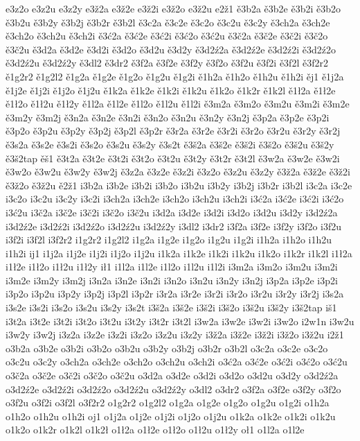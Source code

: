 {e3z2o
e3z2u
e3z2y
e3ž2a
e3ž2e
e3ž2i
e3ž2o
e3ž2u
e2ž1                       
ě3b2a 
ě3b2e 
ě3b2i 
ě3b2o
ě3b2u
ě3b2y
ě3b2j
ě3b2r
ě3b2l
ě3c2a
ě3c2e
ě3c2o
ě3c2u
ě3c2y
ě3ch2a
ě3ch2e
ě3ch2o
ě3ch2u
ě3ch2i
ě3ć2a
ě3ć2e
ě3ć2i
ě3ć2o
ě3ć2u
ě3č2a
ě3č2e
ě3č2i
ě3č2o
ě3č2u
ě3d2a
ě3d2e
ě3d2i
ě3d2o
ě3d2u
ě3d2y
ě3d2ź2a
ě3d2ź2e
ě3d2ź2i
ě3d2ź2o
ě3d2ź2u
ě3d2ź2y
ě3dl2
ě3dr2
ě3f2a
ě3f2e
ě3f2y
ě3f2o
ě3f2u
ě3f2i
ě3f2l
ě3f2r2
ě1g2r2
ě1g2l2
ě1g2a
ě1g2e
ě1g2o
ě1g2u
ě1g2i
ě1h2a
ě1h2o
ě1h2u
ě1h2i
ěj1
ě1j2a
ě1j2e
ě1j2i
ě1j2o
ě1j2u
ě1k2a
ě1k2e
ě1k2i
ě1k2u
ě1k2o
ě1k2r
ě1k2l
ě1ł2a
ě1ł2e
ě1ł2o
ě1ł2u
ě1ł2y
ě1l2a
ě1l2e
ě1l2o
ě1l2u
ě1l2i
ě3m2a
ě3m2o
ě3m2u
ě3m2i
ě3m2e
ě3m2y
ě3m2j
ě3n2a
ě3n2e
ě3n2i
ě3n2o
ě3n2u
ě3n2y
ě3n2j
ě3p2a
ě3p2e
ě3p2i
ě3p2o
ě3p2u
ě3p2y
ě3p2j
ě3p2l
ě3p2r
ě3r2a
ě3r2e
ě3r2i
ě3r2o
ě3r2u
ě3r2y
ě3r2j
ě3s2a
ě3s2e
ě3s2i
ě3s2o
ě3s2u
ě3s2y
ě3s2t
ě3š2a
ě3š2e
ě3š2i
ě3š2o
ě3š2u
ě3š2y
ě3š2tap
ěš1
ě3t2a
ě3t2e
ě3t2i
ě3t2o
ě3t2u
ě3t2y
ě3t2r
ě3t2l
ě3w2a
ě3w2e
ě3w2i
ě3w2o
ě3w2u
ě3w2y
ě3w2j
ě3z2a
ě3z2e
ě3z2i
ě3z2o
ě3z2u
ě3z2y
ě3ž2a
ě3ž2e
ě3ž2i
ě3ž2o
ě3ž2u
ě2ž1                       
i3b2a 
i3b2e 
i3b2i 
i3b2o
i3b2u
i3b2y
i3b2j
i3b2r
i3b2l
i3c2a
i3c2e
i3c2o
i3c2u
i3c2y
i3c2i
i3ch2a
i3ch2e
i3ch2o
i3ch2u
i3ch2i
i3ć2a
i3ć2e
i3ć2i
i3ć2o
i3ć2u
i3č2a
i3č2e
i3č2i
i3č2o
i3č2u
i3d2a
i3d2e
i3d2i
i3d2o
i3d2u
i3d2y
i3d2ź2a
i3d2ź2e
i3d2ź2i
i3d2ź2o
i3d2ź2u
i3d2ź2y
i3dl2
i3dr2
i3f2a
i3f2e
i3f2y
i3f2o
i3f2u
i3f2i
i3f2l
i3f2r2
i1g2r2
i1g2l2
i1g2a
i1g2e
i1g2o
i1g2u
i1g2i
i1h2a
i1h2o
i1h2u
i1h2i
ij1
i1j2a
i1j2e
i1j2i
i1j2o
i1j2u
i1k2a
i1k2e
i1k2i
i1k2u
i1k2o
i1k2r
i1k2l
i1ł2a
i1ł2e
i1ł2o
i1ł2u
i1ł2y
ił1
i1l2a
i1l2e
i1l2o
i1l2u
i1l2i
i3m2a
i3m2o
i3m2u
i3m2i
i3m2e
i3m2y
i3m2j
i3n2a
i3n2e
i3n2i
i3n2o
i3n2u
i3n2y
i3n2j
i3p2a
i3p2e
i3p2i
i3p2o
i3p2u
i3p2y
i3p2j
i3p2l
i3p2r
i3r2a
i3r2e
i3r2i
i3r2o
i3r2u
i3r2y
i3r2j
i3s2a
i3s2e
i3s2i
i3s2o
i3s2u
i3s2y
i3s2t
i3š2a
i3š2e
i3š2i
i3š2o
i3š2u
i3š2y
i3š2tap
iš1
i3t2a
i3t2e
i3t2i
i3t2o
i3t2u
i3t2y
i3t2r
i3t2l
i3w2a
i3w2e
i3w2i
i3w2o
i2w1n
i3w2u
i3w2y
i3w2j
i3z2a
i3z2e
i3z2i
i3z2o
i3z2u
i3z2y
i3ž2a
i3ž2e
i3ž2i
i3ž2o
i3ž2u
i2ž1                       
o3b2a 
o3b2e 
o3b2i 
o3b2o
o3b2u
o3b2y
o3b2j
o3b2r
o3b2l
o3c2a
o3c2e
o3c2o
o3c2u
o3c2y
o3ch2a
o3ch2e
o3ch2o
o3ch2u
o3ch2i
o3ć2a
o3ć2e
o3ć2i
o3ć2o
o3ć2u
o3č2a
o3č2e
o3č2i
o3č2o
o3č2u
o3d2a
o3d2e
o3d2i
o3d2o
o3d2u
o3d2y
o3d2ź2a
o3d2ź2e
o3d2ź2i
o3d2ź2o
o3d2ź2u
o3d2ź2y
o3dl2
o3dr2
o3f2a
o3f2e
o3f2y
o3f2o
o3f2u
o3f2i
o3f2l
o3f2r2
o1g2r2
o1g2l2
o1g2a
o1g2e
o1g2o
o1g2u
o1g2i
o1h2a
o1h2o
o1h2u
o1h2i
oj1
o1j2a
o1j2e
o1j2i
o1j2o
o1j2u
o1k2a
o1k2e
o1k2i
o1k2u
o1k2o
o1k2r
o1k2l
o1k2ł
o1ł2a
o1ł2e
o1ł2o
o1ł2u
o1ł2y
oł1
o1l2a
o1l2e
}
